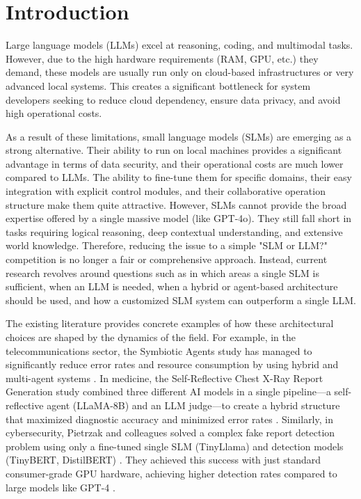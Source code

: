 \section{Introduction}
Large language models (LLMs) excel at reasoning, coding, and multimodal tasks. However, due to the high hardware requirements (RAM, GPU, etc.) they demand, these models are usually run only on cloud-based infrastructures or very advanced local systems. This creates a significant bottleneck for system developers seeking to reduce cloud dependency, ensure data privacy, and avoid high operational costs.

As a result of these limitations, small language models (SLMs) are emerging as a strong alternative. Their ability to run on local machines provides a significant advantage in terms of data security, and their operational costs are much lower compared to LLMs. The ability to fine-tune them for specific domains, their easy integration with explicit control modules, and their collaborative operation structure make them quite attractive. However, SLMs cannot provide the broad expertise offered by a single massive model (like GPT-4o). They still fall short in tasks requiring logical reasoning, deep contextual understanding, and extensive world knowledge. Therefore, reducing the issue to a simple "SLM or LLM?" competition is no longer a fair or comprehensive approach. Instead, current research revolves around questions such as in which areas a single SLM is sufficient, when an LLM is needed, when a hybrid or agent-based architecture should be used, and how a customized SLM system can outperform a single LLM.

The existing literature provides concrete examples of how these architectural choices are shaped by the dynamics of the field. For example, in the telecommunications sector, the Symbiotic Agents study has managed to significantly reduce error rates and resource consumption by using hybrid and multi-agent systems \cite{chatzistefanidis2025symbiotic}. In medicine, the Self-Reflective Chest X-Ray Report Generation study combined three different AI models in a single pipeline---a self-reflective agent (LLaMA-8B) and an LLM judge---to create a hybrid structure that maximized diagnostic accuracy and minimized error rates \cite{han2025self}. Similarly, in cybersecurity, Pietrzak and colleagues solved a complex fake report detection problem using only a fine-tuned single SLM (TinyLlama) and detection models (TinyBERT, DistilBERT) \cite{pietrzak2025what}. They achieved this success with just standard consumer-grade GPU hardware, achieving higher detection rates compared to large models like GPT-4 \cite{pietrzak2025what}.

